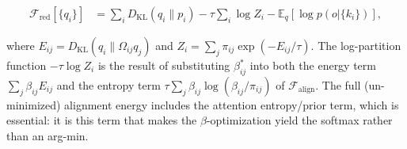\documentclass[11pt]{article}
\begin{document}
\begin{equation}
\boxed{
\begin{aligned}
\mathcal{F}_{\mathrm{red}}[\{q_i\}]
&=\sum_i D_{\mathrm{KL}}(q_i\|p_i)
-\tau\sum_i \log Z_i
-\mathbb{E}_q[\log p(o|\{k_i\})],
\end{aligned}
}
\label{eq:free_energy_reduced}
\end{equation}

where $E_{ij} = D_{\mathrm{KL}}(q_i \| \Omega_{ij} q_j)$ and $Z_i = \sum_j \pi_{ij} \exp(-E_{ij}/\tau)$. The log-partition function $-\tau\log Z_i$ is the result of substituting $\beta_{ij}^*$ into both the energy term $\sum_j \beta_{ij} E_{ij}$ and the entropy term $\tau\sum_j \beta_{ij}\log(\beta_{ij}/\pi_{ij})$ of $\mathcal{F}_{\text{align}}$. The full (un-minimized) alignment energy includes the attention entropy/prior term, which is essential: it is this term that makes the $\beta$-optimization yield the softmax rather than an arg-min.
\end{document}

